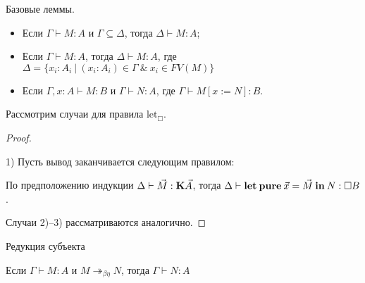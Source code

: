 \begin{lemma} Базовые леммы.

\begin{itemize}
\item Если $\Gamma \vdash M : A$ и $\Gamma \subseteq \Delta$, тогда $\Delta \vdash M : A$;
\item Если $\Gamma \vdash M : A$, тогда $\Delta \vdash M : A$, где $\Delta = \{ x_i : A_i \: | \: (x_i : A_i) \in \Gamma \: \& \: x_i \in FV(M) \}$
\item Если $\Gamma, x : A \vdash M : B$ и $\Gamma \vdash N : A$, где $\Gamma \vdash M [x := N] : B$.
\end{itemize}
\end{lemma}

Рассмотрим случаи для правила $\text{let}_{\Box}$.

\begin{proof}
$ $

1) Пусть вывод заканчивается следующим правилом:

\begin{prooftree}
\end{prooftree}

По предположению индукции $\Delta \vdash \vec{M} : {\bf K} \vec{A}$, тогда $\Delta \vdash {\bf let \: pure \:} \vec{x} = \vec{M} {\: \bf in \: } N : \Box B$.

\vspace{\baselineskip}

Случаи 2)--3) рассматриваются аналогично.

\end{proof}

\begin{theorem} Редукция субъекта

Если $\Gamma \vdash M : A$ и $M \twoheadrightarrow_{\beta \eta} N$, тогда $\Gamma \vdash N : A$

\end{theorem}

